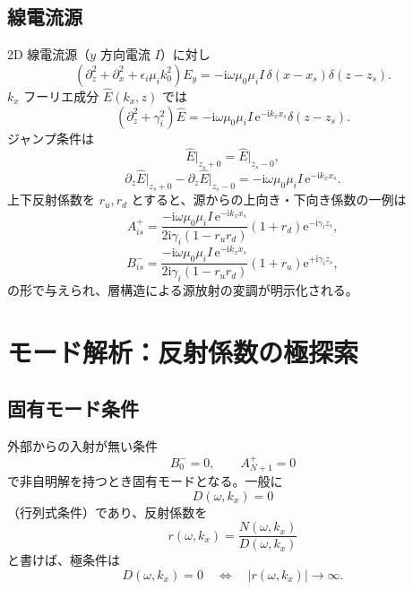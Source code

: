 \documentclass[a4paper,11pt]{article}
\newcommand{\ii}{\mathrm{i}}
\newcommand{\ee}{\mathrm{e}}
\begin{document}
\subsection{線電流源}
2D 線電流源（$y$ 方向電流 $I$）に対し
\begin{equation}
\left(\partial_z^2+\partial_x^2+\epsilon_i\mu_i k_0^2\right)E_y
=
-\ii\omega\mu_0\mu_i I\,\delta(x-x_s)\delta(z-z_s).
\end{equation}
$k_x$ フーリエ成分 $\hat E(k_x,z)$ では
\begin{equation}
\left(\partial_z^2+\gamma_i^2\right)\hat E
=
-\ii\omega\mu_0\mu_i I\,\ee^{-\ii k_x x_s}\delta(z-z_s).
\end{equation}
ジャンプ条件は
\begin{equation}
\hat E\big|_{z_s+0}=\hat E\big|_{z_s-0},
\end{equation}
\begin{equation}
\partial_z\hat E\big|_{z_s+0}-\partial_z\hat E\big|_{z_s-0}
=
-\ii\omega\mu_0\mu_i I\,\ee^{-\ii k_x x_s}.
\end{equation}
上下反射係数を $r_u,r_d$ とすると、源からの上向き・下向き係数の一例は
\begin{equation}
A_{is}^{+}=
\frac{-\ii\omega\mu_0\mu_i I\,\ee^{-\ii k_x x_s}}
{2\ii\gamma_i\left(1-r_u r_d\right)}
\left(1+r_d\right)\ee^{-\ii\gamma_i z_s},
\end{equation}
\begin{equation}
B_{is}^{-}=
\frac{-\ii\omega\mu_0\mu_i I\,\ee^{-\ii k_x x_s}}
{2\ii\gamma_i\left(1-r_u r_d\right)}
\left(1+r_u\right)\ee^{+\ii\gamma_i z_s},
\end{equation}
の形で与えられ、層構造による源放射の変調が明示化される。

\section{モード解析：反射係数の極探索}

\subsection{固有モード条件}
外部からの入射が無い条件
\begin{equation}
B_0^-=0,\qquad A_{N+1}^+=0
\end{equation}
で非自明解を持つとき固有モードとなる。一般に
\begin{equation}
D(\omega,k_x)=0
\end{equation}
（行列式条件）であり、反射係数を
\begin{equation}
r(\omega,k_x)=\frac{N(\omega,k_x)}{D(\omega,k_x)}
\end{equation}
と書けば、極条件は
\begin{equation}
D(\omega,k_x)=0
\quad\Longleftrightarrow\quad
|r(\omega,k_x)|\to\infty.
\end{equation}
\end{document}
